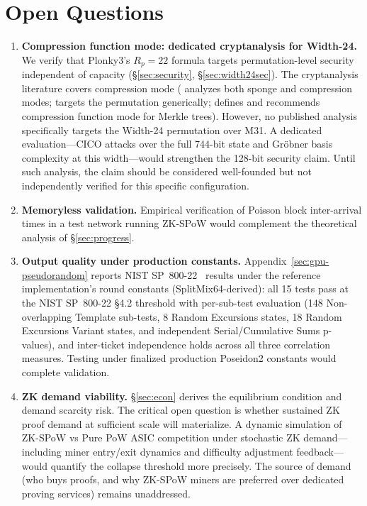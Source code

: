 \documentclass[11pt,a4paper]{article}
\begin{document}
\section{Open Questions}
\label{sec:open}

\begin{enumerate}
\item \textbf{Compression function mode: dedicated cryptanalysis for Width-24.} We verify that Plonky3's $R_p = 22$ formula targets permutation-level security independent of capacity (\S\ref{sec:security}, \S\ref{sec:width24sec}). The cryptanalysis literature covers compression mode (\cite{skipping2026} analyzes both sponge and compression modes; \cite{khovratovich2023} targets the permutation generically; \cite{poseidon2} defines and recommends compression function mode for Merkle trees). However, no published analysis specifically targets the Width-24 permutation over M31. A dedicated evaluation---CICO attacks over the full 744-bit state and Gr\"obner basis complexity at this width---would strengthen the 128-bit security claim. Until such analysis, the claim should be considered well-founded but not independently verified for this specific configuration.

\item \textbf{Memoryless validation.} Empirical verification of Poisson block inter-arrival times in a test network running ZK-SPoW would complement the theoretical analysis of \S\ref{sec:progress}.

\item \textbf{Output quality under production constants.} Appendix~\ref{sec:gpu-pseudorandom} reports NIST SP~800-22~\cite{nist80022} results under the reference implementation's round constants (SplitMix64-derived): all 15 tests pass at the NIST SP~800-22 \S4.2 threshold with per-sub-test evaluation (148 Non-overlapping Template sub-tests, 8 Random Excursions states, 18 Random Excursions Variant states, and independent Serial/Cumulative Sums p-values), and inter-ticket independence holds across all three correlation measures. Testing under finalized production Poseidon2 constants would complete validation.

\item \textbf{ZK demand viability.} \S\ref{sec:econ} derives the equilibrium condition and demand scarcity risk. The critical open question is whether sustained ZK proof demand at sufficient scale will materialize. A dynamic simulation of ZK-SPoW vs Pure PoW ASIC competition under stochastic ZK demand---including miner entry/exit dynamics and difficulty adjustment feedback---would quantify the collapse threshold more precisely. The source of demand (who buys proofs, and why ZK-SPoW miners are preferred over dedicated proving services) remains unaddressed.


\end{enumerate}
\end{document}
